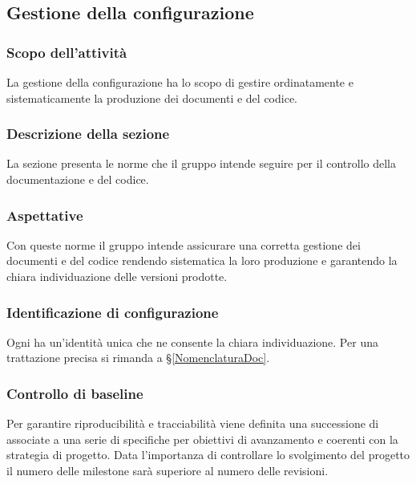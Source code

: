\subsection{Gestione della configurazione}
\subsubsection{Scopo dell'attività} \label{PSup_GestioneConf_Scopo}
La gestione della configurazione ha lo scopo di gestire ordinatamente e sistematicamente la produzione dei documenti e del codice.

\subsubsection{Descrizione della sezione} 
La sezione presenta le norme che il gruppo intende seguire per il controllo della documentazione e del codice.

\subsubsection{Aspettative}
Con queste norme il gruppo intende assicurare una corretta gestione dei documenti e del codice rendendo sistematica la loro produzione e garantendo la chiara individuazione delle versioni prodotte.

\subsubsection{Identificazione di configurazione}
Ogni  ha un'identità unica che ne consente la chiara individuazione. Per una trattazione precisa si rimanda a \S\ref{NomenclaturaDoc}.

\subsubsection{Controllo di baseline}
Per garantire riproducibilità e tracciabilità viene definita una successione di  associate a una serie di  specifiche per obiettivi di avanzamento e coerenti con la strategia di progetto. Data l'importanza di controllare lo svolgimento del progetto il numero delle milestone sarà superiore al numero delle revisioni.

